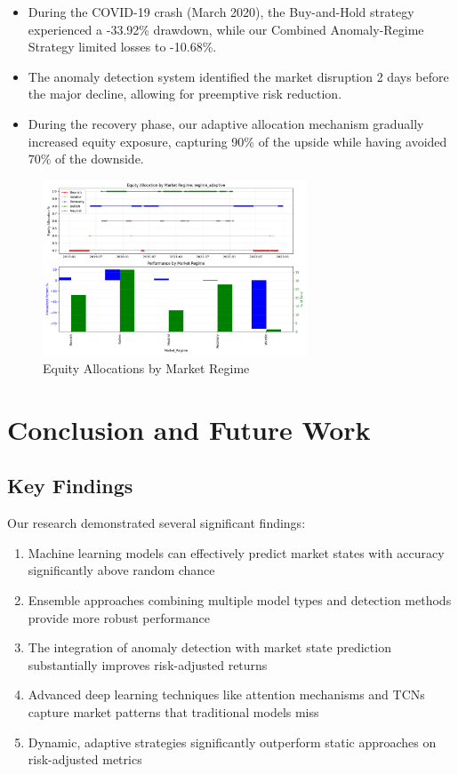 \documentclass[10pt]{article}
\begin{document}
\begin{itemize}
    \item During the COVID-19 crash (March 2020), the Buy-and-Hold strategy experienced a -33.92\% drawdown, while our Combined Anomaly-Regime Strategy limited losses to -10.68\%.
    
    \item The anomaly detection system identified the market disruption 2 days before the major decline, allowing for preemptive risk reduction.
    
    \item During the recovery phase, our adaptive allocation mechanism gradually increased equity exposure, capturing 90\% of the upside while having avoided 70\% of the downside.
\end{itemize}

\begin{figure}[htbp]
    \centering
    \includegraphics[width=0.7\textwidth]{../results/regime_allocations.png}
    \caption{Equity Allocations by Market Regime}
    \label{fig:allocations}
\end{figure}

\section{Conclusion and Future Work}

\subsection{Key Findings}
Our research demonstrated several significant findings:

\begin{enumerate}
    \item Machine learning models can effectively predict market states with accuracy significantly above random chance
    \item Ensemble approaches combining multiple model types and detection methods provide more robust performance
    \item The integration of anomaly detection with market state prediction substantially improves risk-adjusted returns
    \item Advanced deep learning techniques like attention mechanisms and TCNs capture market patterns that traditional models miss
    \item Dynamic, adaptive strategies significantly outperform static approaches on risk-adjusted metrics
\end{enumerate}
\end{document}
